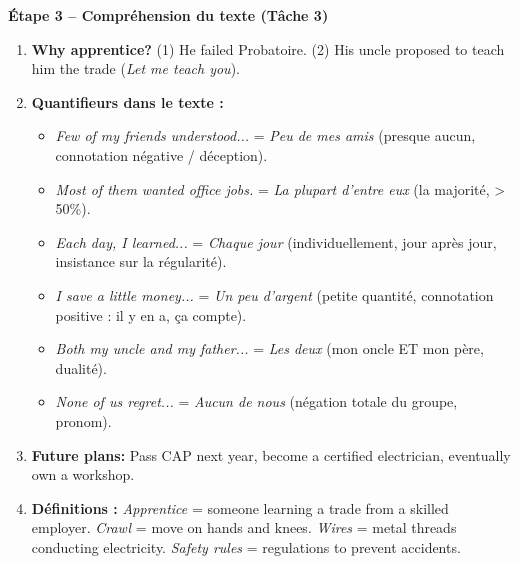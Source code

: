 \documentclass[11pt]{article}
\begin{document}
\textbf{Étape 3 -- Compréhension du texte (Tâche 3)}
\begin{enumerate}
    \item \textbf{Why apprentice?} (1) He failed Probatoire. (2) His uncle proposed to teach him the trade (\emph{Let me teach you}).
    \item \textbf{Quantifieurs dans le texte :}
    \begin{itemize}
        \item \emph{Few of my friends understood...} = \emph{Peu de mes amis} (presque aucun, connotation négative / déception).
        \item \emph{Most of them wanted office jobs.} = \emph{La plupart d'entre eux} (la majorité, > 50\%).
        \item \emph{Each day, I learned...} = \emph{Chaque jour} (individuellement, jour après jour, insistance sur la régularité).
        \item \emph{I save a little money...} = \emph{Un peu d'argent} (petite quantité, connotation positive : il y en a, ça compte).
        \item \emph{Both my uncle and my father...} = \emph{Les deux} (mon oncle ET mon père, dualité).
        \item \emph{None of us regret...} = \emph{Aucun de nous} (négation totale du groupe, pronom).
    \end{itemize}
    \item \textbf{Future plans:} Pass CAP next year, become a certified electrician, eventually own a workshop.
    \item \textbf{Définitions :} \emph{Apprentice} = someone learning a trade from a skilled employer. \emph{Crawl} = move on hands and knees. \emph{Wires} = metal threads conducting electricity. \emph{Safety rules} = regulations to prevent accidents.
\end{enumerate}
\end{document}
